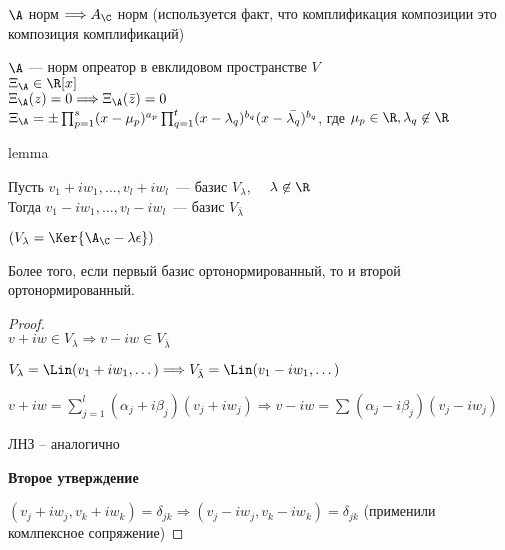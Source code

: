 \follow $\A $ норм $ \Longrightarrow A_{\C} $ норм (используется факт, что комплификация композиции это композиция комплификаций)


\begin{theorem}
    $ \A $ --- норм опреатор в евклидовом пространстве $ V $ \\
    $ \Xi_{\A} \in \R[x] $ \\
    $ \Xi_{\A}(z) = 0 \Longrightarrow \Xi_{\A}(\bar{z}) = 0 $ \\
    $ \Xi_{\A} = \pm \prod_{p = 1}^{s} (x - \mu_p)^{a_p} \prod_{q = 1}^{t} (x - \lambda_q)^{b_q} (x - \bar{\lambda_q})^{b_q}$, где $\mu_p \in \R , \lambda_q \not \in \R$ \\
\end{theorem}

lemma

Пусть $v_1 + iw_1, \dots, v_l + iw_l$~--- базис $V_{\lambda}$, $\quad \lambda \not \in \R$ \\
Тогда $v_1 - iw_1, \dots, v_l - iw_l$~--- базис $V_{\bar{\lambda}}$

$ (V_{\lambda} = \Ker{\A_{\C} - \lambda \epsilon}) $ %

Более того, если первый базис ортонормированный, то и второй ортонормированный.

\begin{proof}
$ $ \\
$v + iw \in V_{\lambda} \Longrightarrow v - iw \in V_{\bar{\lambda}}$ %

$ V_{\lambda} = \Lin(v_1 + iw_1, \dots ) \Longrightarrow V_{\bar{\lambda}} = \Lin(v_1 - iw_1, \dots) $

$ v + iw = \sum_{j = 1}^{l} (\alpha_j + i \beta_j) (v_j + i w_j) \Longrightarrow v - iw = \sum_{}^{} (\alpha_j - i \beta_j) (v_j - i w_j) $

ЛНЗ -- аналогично


\textbf{Второе утверждение} 

$ (v_j + i w_j, v_k + iw_k) = \delta_{jk} \Longrightarrow  (v_j - i w_j, v_k - iw_k) = \delta_{jk}$ (применили комлпексное сопряжение)
\end{proof}

